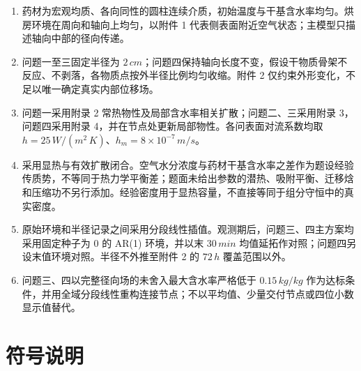 \documentclass[withoutpreface,bwprint]{cumcmthesis}
\begin{document}
\begin{enumerate}
  \item 药材为宏观均质、各向同性的圆柱连续介质，初始温度与干基含水率均匀。烘房环境在周向和轴向上均匀，以附件 1 代表侧表面附近空气状态；主模型只描述轴向中部的径向传递。
  \item 问题一至三固定半径为 $2\,\si{cm}$；问题四保持轴向长度不变，假设干物质骨架不反应、不剥落，各物质点按外半径比例均匀收缩。附件 2 仅约束外形变化，不足以唯一确定真实内部位移场。
  \item 问题一采用附录 2 常热物性及局部含水率相关扩散；问题二、三采用附录 3，问题四采用附录 4，并在节点处更新局部物性。各问表面对流系数均取 $h=25\,\si{W/(m^2\,K)}$、$h_m=8\times10^{-7}\,\si{m/s}$。
  \item 采用显热与有效扩散闭合。空气水分浓度与药材干基含水率之差作为题设经验传质势，不等同于热力学平衡差；题面未给出参数的潜热、吸附平衡、迁移焓和压缩功不另行添加。经验密度用于显热容量，不直接等同于组分守恒中的真实密度。
  \item 原始环境和半径记录之间采用分段线性插值。观测期后，问题三、四主方案均采用固定种子为 $0$ 的 AR(1) 环境，并以末 $30\,\si{min}$ 均值延拓作对照；问题四另设末值环境对照。半径不外推至附件 2 的 $72\,\si{h}$ 覆盖范围以外。
  \item 问题三、四以完整径向场的未舍入最大含水率严格低于 $0.15\,\si{kg/kg}$ 作为达标条件，并用全域分段线性重构连接节点；不以平均值、少量交付节点或四位小数显示值替代。
\end{enumerate}

\section{符号说明}
\end{document}
